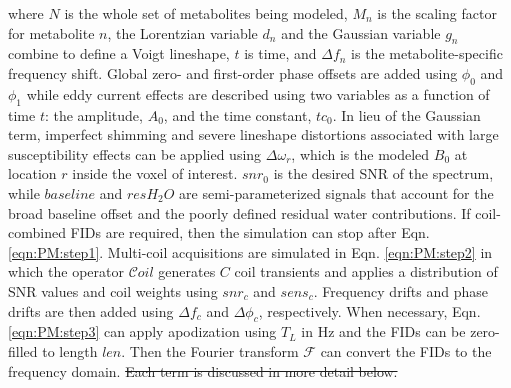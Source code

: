 \documentclass[AMA,LATO1COL]{WileyNJD-v2}
\providecommand{\DIFdel}[1]{{\protect\color{red}\sout{#1}}}                      %
\providecommand{\DIFdelbegin}{} %
\providecommand{\DIFdelend}{} %
\begin{document}
\DIFdelend where $N$ is the whole set of metabolites being modeled, $M_n$ is the scaling factor for metabolite $n$, the Lorentzian variable $d_n$ and the Gaussian variable $g_n$ combine to define a Voigt lineshape, $t$ is time, and $\Delta f_n$ is the metabolite-specific frequency shift. Global zero- and first-order phase offsets are added using $\phi_0$ and $\phi_1$ while eddy current effects are described using two variables as a function of time $t$: the amplitude, $A_0$, and the time constant, $tc_0$. In lieu of the Gaussian term, imperfect shimming and severe lineshape distortions associated with large susceptibility effects can be applied using $\Delta\omega_r$, which is the modeled $B_0$ at location $r$ inside the voxel of interest. $snr_0$ is the desired SNR of the spectrum, while $baseline$ and $resH_2O$ are semi-parameterized signals that account for the broad baseline offset and the poorly defined residual water contributions. If coil-combined FIDs are required, then the simulation can stop after Eqn. \ref{eqn:PM:step1}. Multi-coil acquisitions are simulated in Eqn. \ref{eqn:PM:step2} in which the operator $\mathcal{C}oil$ generates $C$ coil transients and applies a distribution of SNR values and coil weights using $snr_c$ and $sens_c$. Frequency drifts and phase drifts are then added using $\Delta f_c$ and $\Delta \phi_c$, respectively. When necessary, Eqn. \ref{eqn:PM:step3} can apply apodization using $T_L$ in Hz and the FIDs can be zero-filled to length $len$. Then the Fourier transform $\mathcal{F}$ can convert the FIDs to the frequency domain. \DIFdelbegin \DIFdel{Each term is discussed in more detail below. 
}%
\end{document}
